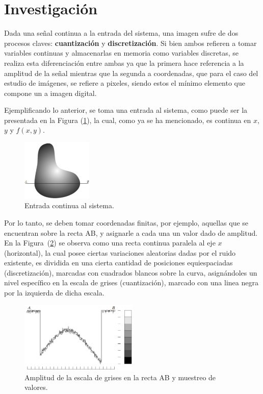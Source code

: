 	
\section{Investigación}
Dada una señal continua a la entrada del sistema, una imagen sufre de dos procesos claves: \textbf{cuantización} y \textbf{discretización}. Si bien ambos refieren a tomar variables continuas y almacenarlas en memoria como variables discretas, se realiza esta diferenciación entre ambas ya que la primera hace referencia a la amplitud de la señal mientras que la segunda a coordenadas, que para el caso del estudio de imágenes, se refiere a pixeles, siendo estos el mínimo elemento que compone un a imagen digital.
	
Ejemplificando lo anterior, se toma una entrada al sistema, como puede ser la presentada en la Figura (\ref{fig:disc1}), la cual, como ya se ha mencionado, es continua en $x$, $y$ y $f(x,y)$.
\begin{figure}[H]
\centering
	\includegraphics[width=0.3\textwidth]{Imagenes/Digitalizacion_1.png}
	\caption{Entrada continua al sistema.}
	\label{fig:disc1}
\end{figure}

Por lo tanto, se deben tomar coordenadas finitas, por ejemplo, aquellas que se encuentran sobre la recta AB, y asignarle a cada una un valor dado de amplitud. En la Figura~(\ref{fig:disc2}) se observa como una recta continua paralela al eje $x$ (horizontal), la cual posee ciertas variaciones aleatorias dadas por el ruido existente, es dividida en una cierta cantidad de posiciones equiespaciadas (discretización), marcadas con cuadrados blancos sobre la curva, asignándoles un nivel específico en la escala de grises (cuantización), marcado con una linea negra por la izquierda de dicha escala.
\begin{figure}[H]
\centering
	\includegraphics[width=0.5\textwidth]{Imagenes/Digitalizacion_2.png}
	\caption{Amplitud de la escala de grises en la recta AB y muestreo de valores.}
	\label{fig:disc2}
\end{figure}

